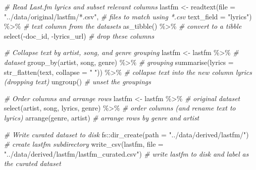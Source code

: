 \documentclass[
]{article}
\newenvironment{Shaded}{\begin{snugshade}}{\end{snugshade}}
\newcommand{\AttributeTok}[1]{\textcolor[rgb]{0.77,0.63,0.00}{#1}}
\newcommand{\CommentTok}[1]{\textcolor[rgb]{0.56,0.35,0.01}{\textit{#1}}}
\newcommand{\FunctionTok}[1]{\textcolor[rgb]{0.00,0.00,0.00}{#1}}
\newcommand{\NormalTok}[1]{#1}
\newcommand{\OtherTok}[1]{\textcolor[rgb]{0.56,0.35,0.01}{#1}}
\newcommand{\SpecialCharTok}[1]{\textcolor[rgb]{0.00,0.00,0.00}{#1}}
\newcommand{\StringTok}[1]{\textcolor[rgb]{0.31,0.60,0.02}{#1}}
\begin{document}
\begin{Shaded}
\begin{Highlighting}[]
\CommentTok{\# Read Last.fm lyrics and subset relevant columns}
\NormalTok{lastfm }\OtherTok{\textless{}{-}} 
  \FunctionTok{readtext}\NormalTok{(}\AttributeTok{file =} \StringTok{"../data/original/lastfm/*.csv"}\NormalTok{, }\CommentTok{\# files to match using *.csv}
           \AttributeTok{text\_field =} \StringTok{"lyrics"}\NormalTok{) }\SpecialCharTok{\%\textgreater{}\%} \CommentTok{\# text column from the datasets}
  \FunctionTok{as\_tibble}\NormalTok{() }\SpecialCharTok{\%\textgreater{}\%} \CommentTok{\# convert to a tibble}
  \FunctionTok{select}\NormalTok{(}\SpecialCharTok{{-}}\NormalTok{doc\_id, }\SpecialCharTok{{-}}\NormalTok{lyrics\_url) }\CommentTok{\# drop these columns}

\CommentTok{\# Collapse text by artist, song, and genre grouping}
\NormalTok{lastfm }\OtherTok{\textless{}{-}} 
\NormalTok{  lastfm }\SpecialCharTok{\%\textgreater{}\%} \CommentTok{\# dataset}
  \FunctionTok{group\_by}\NormalTok{(artist, song, genre) }\SpecialCharTok{\%\textgreater{}\%} \CommentTok{\# grouping}
  \FunctionTok{summarise}\NormalTok{(}\AttributeTok{lyrics =} \FunctionTok{str\_flatten}\NormalTok{(text, }\AttributeTok{collapse =} \StringTok{" "}\NormalTok{)) }\SpecialCharTok{\%\textgreater{}\%}  \CommentTok{\# collapse text into the new column \textasciigrave{}lyrics\textasciigrave{} (dropping \textasciigrave{}text\textasciigrave{})}
  \FunctionTok{ungroup}\NormalTok{() }\CommentTok{\# unset the groupings}

\CommentTok{\# Order columns and arrange rows}
\NormalTok{lastfm }\OtherTok{\textless{}{-}} 
\NormalTok{  lastfm }\SpecialCharTok{\%\textgreater{}\%} \CommentTok{\# original dataset}
  \FunctionTok{select}\NormalTok{(artist, song, lyrics, genre) }\SpecialCharTok{\%\textgreater{}\%} \CommentTok{\# order columns (and rename \textasciigrave{}text\textasciigrave{} to \textasciigrave{}lyrics\textasciigrave{})}
  \FunctionTok{arrange}\NormalTok{(genre, artist) }\CommentTok{\# arrange rows by \textasciigrave{}genre\textasciigrave{} and \textasciigrave{}artist\textasciigrave{}}

\CommentTok{\# Write curated dataset to disk}
\NormalTok{fs}\SpecialCharTok{::}\FunctionTok{dir\_create}\NormalTok{(}\AttributeTok{path =} \StringTok{"../data/derived/lastfm/"}\NormalTok{) }\CommentTok{\# create lastfm subdirectory}
\FunctionTok{write\_csv}\NormalTok{(lastfm, }
          \AttributeTok{file =} \StringTok{"../data/derived/lastfm/lastfm\_curated.csv"}\NormalTok{) }\CommentTok{\# write lastfm to disk and label as the curated dataset}
\end{Highlighting}
\end{Shaded}
\end{document}
